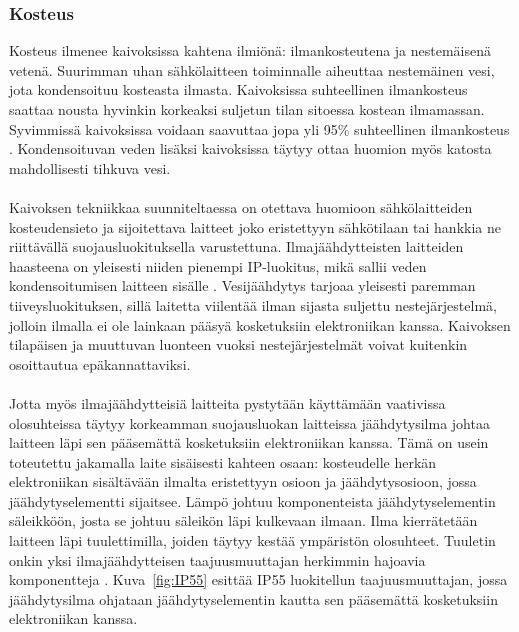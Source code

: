 \documentclass[finnish,12pt,a4paper,pdftex,elec,utf8]{aaltothesis}
\begin{document}
\subsubsection{Kosteus}
Kosteus ilmenee kaivoksissa kahtena ilmiönä: ilmankosteutena ja nestemäisenä vetenä. Suurimman uhan sähkölaitteen toiminnalle aiheuttaa nestemäinen vesi, jota kondensoituu kosteasta ilmasta. Kaivoksissa suhteellinen ilmankosteus saattaa nousta hyvinkin korkeaksi suljetun tilan sitoessa kostean ilmamassan.  Syvimmissä kaivoksissa voidaan saavuttaa jopa yli 95\% suhteellinen ilmankosteus \cite{manchao}. Kondensoituvan veden lisäksi kaivoksissa täytyy ottaa huomion myös katosta mahdollisesti tihkuva vesi.
\\\\
Kaivoksen tekniikkaa suunniteltaessa on otettava huomioon sähkölaitteiden kosteudensieto ja sijoitettava laitteet joko eristettyyn sähkötilaan tai hankkia ne riittävällä suojausluokituksella varustettuna. Ilmajäähdytteisten laitteiden haasteena on yleisesti niiden pienempi IP-luokitus, mikä sallii veden kondensoitumisen laitteen sisälle \cite{Pallasmaa}. Vesijäähdytys tarjoaa yleisesti paremman tiiveysluokituksen, sillä laitetta viilentää ilman sijasta suljettu nestejärjestelmä, jolloin ilmalla ei ole lainkaan pääsyä kosketuksiin elektroniikan kanssa. Kaivoksen tilapäisen ja muuttuvan luonteen vuoksi nestejärjestelmät voivat kuitenkin osoittautua epäkannattaviksi.
\\\\
Jotta myös ilmajäähdytteisiä laitteita pystytään käyttämään vaativissa olosuhteissa täytyy korkeamman suojausluokan laitteissa jäähdytysilma johtaa laitteen läpi sen pääsemättä kosketuksiin elektroniikan kanssa. Tämä on usein toteutettu jakamalla laite sisäisesti kahteen osaan: kosteudelle herkän elektroniikan sisältävään ilmalta eristettyyn osioon ja jäähdytysosioon, jossa jäähdytyselementti  sijaitsee.  Lämpö johtuu komponenteista jäähdytyselementin säleikköön, josta se johtuu säleikön läpi kulkevaan ilmaan. Ilma kierrätetään laitteen läpi tuulettimilla, joiden täytyy kestää ympäristön olosuhteet. Tuuletin onkin yksi ilmajäähdytteisen taajuusmuuttajan herkimmin hajoavia komponentteja \cite{Muttilainen}. Kuva~\ref{fig:IP55} esittää IP55 luokitellun taajuusmuuttajan, jossa jäähdytysilma ohjataan jäähdytyselementin kautta sen pääsemättä kosketuksiin elektroniikan kanssa.
\end{document}
